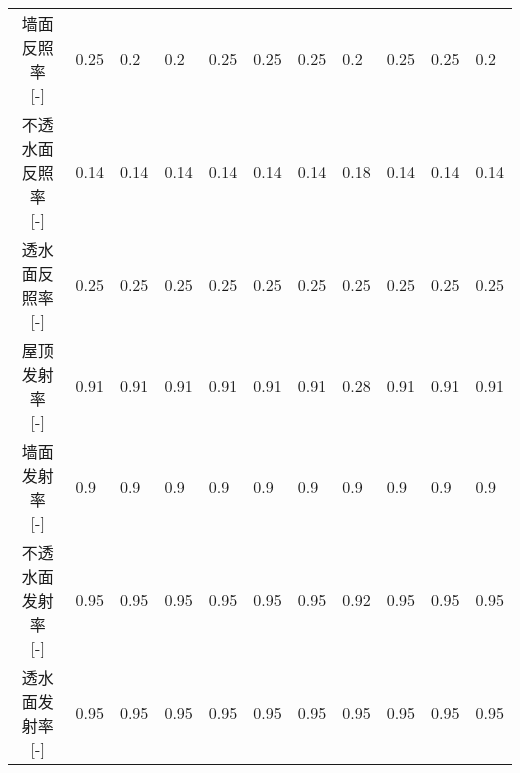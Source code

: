 \begin{landscape}
\begin{table}[htbp]
\begin{tabular}{@{}cllllllllll@{}}
      \makecell{墙面反照率     \\ {[-]}}                      & 0.25                 & 0.2                  & 0.2                 & 0.25                & 0.25                & 0.25                 & 0.2                  & 0.25                & 0.25                  & 0.2                  \\
      \makecell{不透水面反照率 \\ {[-]}}                      & 0.14                 & 0.14                 & 0.14                & 0.14                & 0.14                & 0.14                 & 0.18                 & 0.14                & 0.14                  & 0.14                 \\
      \makecell{透水面反照率   \\ {[-]}}                      & 0.25                 & 0.25                 & 0.25                & 0.25                & 0.25                & 0.25                 & 0.25                 & 0.25                & 0.25                  & 0.25                 \\
      \makecell{屋顶发射率     \\ {[-]}}                      & 0.91                 & 0.91                 & 0.91                & 0.91                & 0.91                & 0.91                 & 0.28                 & 0.91                & 0.91                  & 0.91                 \\
      \makecell{墙面发射率     \\ {[-]}}                      & 0.9                  & 0.9                  & 0.9                 & 0.9                 & 0.9                 & 0.9                  & 0.9                  & 0.9                 & 0.9                   & 0.9                  \\
      \makecell{不透水面发射率 \\ {[-]}}                      & 0.95                 & 0.95                 & 0.95                & 0.95                & 0.95                & 0.95                 & 0.92                 & 0.95                & 0.95                  & 0.95                 \\
      \makecell{透水面发射率   \\ {[-]}}                      & 0.95                 & 0.95                 & 0.95                & 0.95                & 0.95                & 0.95                 & 0.95                 & 0.95                & 0.95                  & 0.95                 \\

\end{tabular}
\end{table}
\end{landscape}

